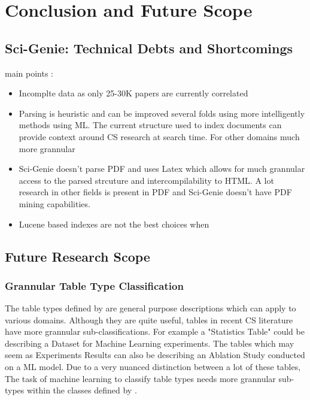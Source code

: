 \chapter{Conclusion and Future Scope}
\label{conclusion}

\section{Sci-Genie: Technical Debts and Shortcomings}
main points : 
\begin{itemize}
    \item Incomplte data as only 25-30K papers are currently correlated
    \item Parsing is heuristic and can be improved several folds using more intelligently methods using ML. The current structure used to index documents can provide context around CS research at search time. For other domains much more grannular 
    \item Sci-Genie doesn't parse PDF and uses Latex which allows for much grannular access to the parsed strcuture and intercompilability to HTML. A lot research in other fields is present in PDF and Sci-Genie doesn't have PDF mining capabilities. 
    \item Lucene based indexes are not the best choices when 
\end{itemize}

\section{Future Research Scope}
\label{conclusion:future-scope}
\subsection{Grannular Table Type Classification}
\label{conclusion:future-scope:type-class}

The table types defined by \cite{kim2012scientific} are general purpose descriptions which can apply to various domains. Although they are quite useful, tables in recent CS literature have more grannular sub-classifications. For example a "Statistics Table" could be describing a Dataset for Machine Learning experiments. The tables which may seem as Experiments Results can also be describing an Ablation Study conducted on a ML model. Due to a very nuanced distinction between a lot of these tables, The task of machine learning to classify table types needs more grannular sub-types within the classes defined by \cite{kim2012scientific}. 

